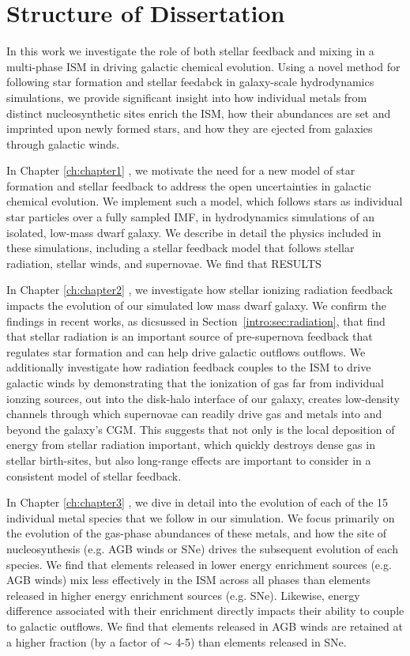 \section{Structure of Dissertation}\label{intro:sec:structure}

In this work we investigate the role of both stellar feedback and mixing in a multi-phase ISM in driving galactic chemical evolution. Using a novel method for following star formation and stellar feedabck in galaxy-scale hydrodynamics simulations, we provide significant insight into how individual metals from distinct nucleosynthetic sites enrich the ISM, how their abundances are set and imprinted upon newly formed stars, and how they are ejected from galaxies through galactic winds. 

In Chapter \ref{ch:chapter1} \citep[published as ][]{Emerick2019}, we motivate the need for a new model of star formation and stellar feedback to address the open uncertainties in galactic chemical evolution. We implement such a model, which follows stars as individual star particles over a fully sampled IMF, in hydrodynamics simulations of an isolated, low-mass dwarf galaxy. We describe in detail the physics included in these simulations, including a stellar feedback model that follows stellar radiation, stellar winds, and supernovae. We find that RESULTS

In Chapter \ref{ch:chapter2} \citep[published as ][]{Emerick2018a}, we investigate how stellar ionizing radiation feedback impacts the evolution of our simulated low mass dwarf galaxy. We confirm the findings in recent works, as dicsussed in Section~\ref{intro:sec:radiation}, that find that stellar radiation is an important source of pre-supernova feedback that regulates star formation and can help drive galactic outflows outflows. We additionally investigate how radiation feedback couples to the ISM to drive galactic winds by demonstrating that the ionization of gas far from individual ionzing sources, out into the disk-halo interface of our galaxy, creates low-density channels through which supernovae can readily drive gas and metals into and beyond the galaxy's CGM. This suggests that not only is the local deposition of energy from stellar radiation important, which quickly destroys dense gas in stellar birth-sites, but also long-range effects are important to consider in a consistent model of stellar feedback.

In Chapter \ref{ch:chapter3} \citep[published as ][]{Emerick2018b}, we dive in detail into the evolution of each of the 15 individual metal species that we follow in our simulation. We focus primarily on the evolution of the gas-phase abundances of these metals, and how the site of nucleosynthesis (e.g. AGB winds or SNe) drives the subsequent evolution of each species. We find that elements released in lower energy enrichment sources (e.g. AGB winds) mix less effectively in the ISM across all phases than elements released in higher energy enrichment sources (e.g. SNe). Likewise, energy difference associated with their enrichment directly impacts their ability to couple to galactic outflows. We find that elements released in AGB winds are retained at a higher fraction (by a factor of $\sim$ 4-5) than elements released in SNe. 

